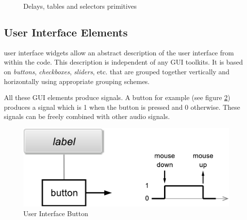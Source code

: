 \documentclass[a4paper]{book}
\begin{document}
\begin{figure}
\caption{Delays, tables and selectors primitives }
\label{fig:delays}
\end{figure}


\subsection{User Interface Elements}


\faust user interface widgets allow an abstract description of the user interface from within the \faust code. This description is
independent of any GUI toolkits. It is based on \emph{buttons}, \emph{checkboxes}, \emph{sliders}, etc. that are grouped together vertically and
horizontally using appropriate grouping schemes.

All these GUI elements produce signals. A button for example (see figure \ref{fig:button}) produces a signal which is 1 when the button is pressed and 0 otherwise.
These signals can be freely combined with other audio signals.

\begin{figure}[h]
\centering
\includegraphics[scale=0.5]{illustrations/button}
\caption{User Interface Button}
\label{fig:button}
\end{figure}


\bigskip
\end{document}
